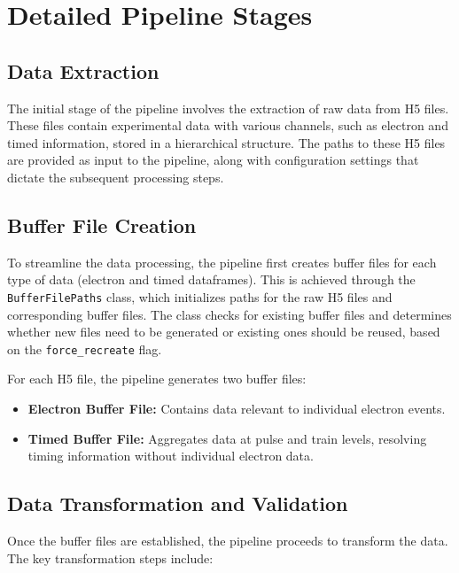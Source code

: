 \section*{Detailed Pipeline Stages}

\subsection*{Data Extraction}
The initial stage of the pipeline involves the extraction of raw data from H5 files. These files contain experimental data with various channels, such as electron and timed information, stored in a hierarchical structure. The paths to these H5 files are provided as input to the pipeline, along with configuration settings that dictate the subsequent processing steps.

\subsection*{Buffer File Creation}
To streamline the data processing, the pipeline first creates buffer files for each type of data (electron and timed dataframes). This is achieved through the \texttt{BufferFilePaths} class, which initializes paths for the raw H5 files and corresponding buffer files. The class checks for existing buffer files and determines whether new files need to be generated or existing ones should be reused, based on the \texttt{force\_recreate} flag.

For each H5 file, the pipeline generates two buffer files:
\begin{itemize}
    \item \textbf{Electron Buffer File:} Contains data relevant to individual electron events.
    \item \textbf{Timed Buffer File:} Aggregates data at pulse and train levels, resolving timing information without individual electron data.
\end{itemize}

\subsection*{Data Transformation and Validation}
Once the buffer files are established, the pipeline proceeds to transform the data. The key transformation steps include:

